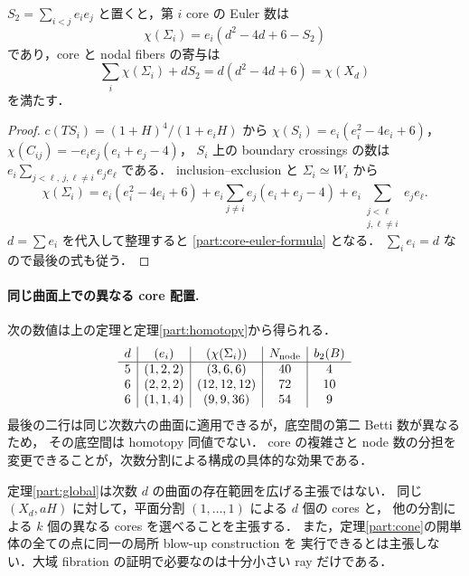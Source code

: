 \begin{corollary}
\label{part:core-euler}
$S_2=\sum_{i<j}e_i e_j$ と置くと，第 $i$ core の Euler 数は
\begin{equation}\label{part:core-euler-formula}
 \chi(\Sigma_i)=e_i(d^2-4d+6-S_2)
\end{equation}
であり，core と nodal fibers の寄与は
\[
 \sum_i\chi(\Sigma_i)+dS_2=d(d^2-4d+6)=\chi(X_d)
\]
を満たす．
\end{corollary}
\begin{proof}
$c(TS_i)=(1+H)^4/(1+e_iH)$ から $\chi(S_i)=e_i(e_i^2-4e_i+6)$，
$\chi(C_{ij})=-e_i e_j(e_i+e_j-4)$，
$S_i$ 上の boundary crossings の数は
$e_i\sum_{j<\ell,\ j,\ell\ne i}e_j e_\ell$ である．
inclusion--exclusion と $\Sigma_i\simeq W_i$ から
\[
 \chi(\Sigma_i)
 =e_i(e_i^2-4e_i+6)
 +e_i\sum_{j\ne i}e_j(e_i+e_j-4)
 +e_i\sum_{\substack{j<\ell\\ j,\ell\ne i}}e_j e_\ell.
\]
$d=\sum e_i$ を代入して整理すると \eqref{part:core-euler-formula} となる．
$\sum_i e_i=d$ なので最後の式も従う．
\end{proof}

\paragraph{同じ曲面上での異なる core 配置.}
次の数値は上の定理と定理\ref{part:homotopy}から得られる．
\[
\begin{array}{c|c|c|c|c}
 d & (e_i) & (\chi(\Sigma_i)) & N_{\rm node} & b_2(B)\\ \hline
 5 &(1,2,2)&(3,6,6)&40&4\\
 6 &(2,2,2)&(12,12,12)&72&10\\
 6 &(1,1,4)&(9,9,36)&54&9
\end{array}
\]
最後の二行は同じ次数六の曲面に適用できるが，底空間の第二 Betti 数が異なるため，
その底空間は homotopy 同値でない．
core の複雑さと node 数の分担を変更できることが，次数分割による構成の具体的な効果である．

\begin{remark}
定理\ref{part:global}は次数 $d$ の曲面の存在範囲を広げる主張ではない．
同じ $(X_d,aH)$ に対して，平面分割 $(1,\ldots,1)$ による $d$ 個の cores と，
他の分割による $k$ 個の異なる cores を選べることを主張する．
また，定理\ref{part:cone}の開単体の全ての点に同一の局所 blow-up construction を
実行できるとは主張しない．大域 fibration の証明で必要なのは十分小さい ray だけである．
\end{remark}
